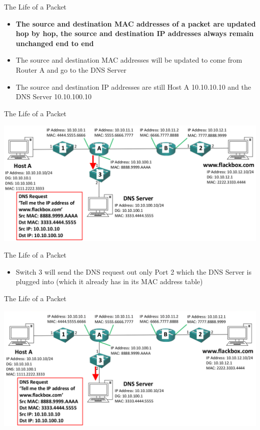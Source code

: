 \documentclass[pdflatex,compress,mathserif]{beamer}
\begin{document}
\begin{frame}{The Life of a Packet}
	\begin{itemize}
		\item \textbf{The source and destination MAC addresses of a packet are updated hop by hop, the source and destination IP addresses always remain unchanged end to end}
		\item The source and destination MAC addresses will be updated to come from Router A and go to the DNS Server
		\item The source and destination IP addresses are still Host A 10.10.10.10 and the DNS Server 10.10.100.10
	\end{itemize}
\end{frame}

\begin{frame}{The Life of a Packet}
	\begin{center}
		\includegraphics[width=\linewidth]{img/img27}
	\end{center}
\end{frame}

\begin{frame}{The Life of a Packet}
	\begin{itemize}
		\item Switch 3 will send the DNS request out only Port 2 which the DNS Server is plugged into (which it already has in its MAC address table)
	\end{itemize}
\end{frame}

\begin{frame}{The Life of a Packet}
	\begin{center}
		\includegraphics[width=\linewidth]{img/img28}
	\end{center}
\end{frame}
\end{document}
